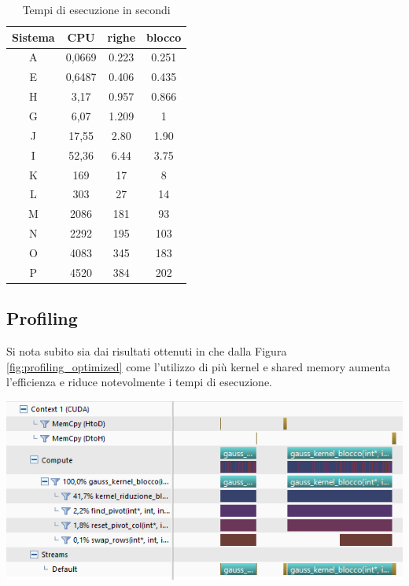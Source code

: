 \documentclass{article}
\begin{document}
\begin{table}[h!]
\centering
 \begin{tabular}{|c | c | c | c |} 
 \hline
 Sistema & CPU & righe & blocco\\
 \hline
A & 0,0669    & 0.223 & 0.251\\
E & 0,6487    & 0.406 & 0.435\\	
H & 3,17      & 0.957 & 0.866\\
G & 6,07      & 1.209 & 1\\
J & 17,55     & 2.80  & 1.90\\
I & 52,36     & 6.44  & 3.75\\
K & 169       & 17    & 8\\
L & 303       & 27    & 14\\
M & 2086      & 181   & 93\\
N & 2292      & 195   & 103\\
O & 4083      & 345   & 183\\
P & 4520      & 384   & 202\\
 \hline

\end{tabular}
\caption{Tempi di esecuzione in secondi}
\label{table:1}
\end{table}

\subsection{Profiling}
Si nota subito sia dai risultati ottenuti in che dalla Figura \ref{fig:profiling_optimized} come l'utilizzo di più kernel e shared memory aumenta l'efficienza e riduce notevolmente i tempi di esecuzione. 
	\begin{center}
		\includegraphics[width = \textwidth]{profiling_optimized.png}
		\label{fig:profiling_optimized}
	\end{center}
\end{document}
